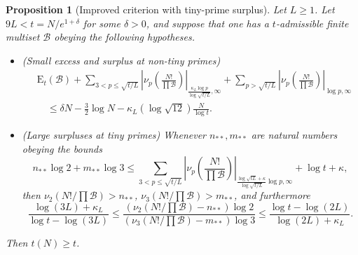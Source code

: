 \documentclass[12pt,a4paper,reqno]{amsart}
\numberwithin{equation}{section}
\theoremstyle{plain}
\newtheorem{proposition}[theorem]{Proposition}
\theoremstyle{definition}
\newcommand\tuple{{\mathcal B}}
\newcommand\excess{{\mathrm{E}}}
\begin{document}
\begin{proposition}[Improved criterion with tiny-prime surplus]\label{balance-23'}  Let $L \geq 1$.
  Let $9L < t = N/e^{1+\delta}$ for some $\delta>0$, and suppose that one has a $t$-admissible finite multiset $\tuple$ obeying the following hypotheses.
\begin{itemize}
\item[(i)] (Small excess and surplus at non-tiny primes)
\begin{equation}\label{new-balance-4}
  \begin{split}
&      \excess_t(\tuple) + \sum_{3 < p \leq \sqrt{t/L}}
 \left|\nu_p\left(\frac{N!}{\prod \tuple}\right)\right|_{\frac{\kappa_L \log p}{\log \sqrt{t/L}},\infty} + 
 \sum_{p>\sqrt{t/L}} \left|\nu_p\left(\frac{N!}{\prod \tuple}\right)\right|_{\log p,\infty}\\
&\quad    \leq \delta N - \frac{3}{2} \log N - \kappa_L (\log \sqrt{12}) \frac{N}{\log t}.
  \end{split}
 \end{equation}
 \item[(ii)] (Large surpluses at tiny primes) Whenever $n_{**}, m_{**}$ are natural numbers obeying the  bounds
 $$ n_{**} \log 2 + m_{**} \log 3 \leq 
 \sum_{3 < p \leq \sqrt{t/L}}
 \left|\nu_p\left(\frac{N!}{\prod \tuple}\right)\right|_{\frac{\log \sqrt{tL} + \kappa}{\log\sqrt{t/L}} \log p,\infty}
 + \log t + \kappa,$$
 then $\nu_2(N!/\prod \tuple) > n_{**}$, $\nu_3(N!/\prod \tuple) > m_{**}$, and furthermore
 $$
 \frac{\log(3L)+\kappa_L}{\log t - \log(3L)} \leq \frac{(\nu_2(N!/\prod \tuple)-n_{**}) \log 2}{(\nu_3(N!/\prod \tuple)-m_{**}) \log 3} \leq \frac{\log t - \log(2L)}{\log(2L)+\kappa_L}.$$
 \end{itemize}
  Then $t(N) \geq t$.
\end{proposition}
\end{document}
